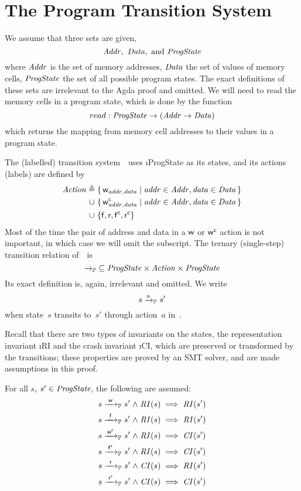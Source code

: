 \section{The Program Transition System~\Prog}
\label{sec:Prog}

We assume that three sets are given,  
$$\mathit{Addr},\ \mathit{Data},\ \text{and}\ \mathit{ProgState}$$
where $\mathit{Addr}$ is the set of memory addresses, $\mathit{Data}$ the set of values of memory cells, $\mathit{ProgState}$ the set of all possible program states.
The exact definitions of these sets are irrelevant to the Agda proof and omitted.
We will need to read the memory cells in a program state, which is done by the function
$$ read : \mathit{ProgState} \to (\mathit{Addr} \to \mathit{Data}) $$
which returns the mapping from memory cell addresses to their values in a program state.

The (labelled) transition system~\Prog\ uses \i{ProgState} as its states, and its actions (labels) are defined by%
\begin{align*}
	\mathit{Action} {}\triangleq{}{} &\{\, \mathsf w_{\mathit{addr}, \mathit{data}} \mid \mathit{addr} \in \mathit{Addr}, \mathit{data} \in \mathit{Data} \,\} \\
	\cup \ &\{\, \mathsf w^\mathsf{c}_{\mathit{addr}, \mathit{data}} \mid \mathit{addr} \in \mathit{Addr}, \mathit{data} \in \mathit{Data} \,\}\\
	\cup \ &\{ \mathsf f, \mathsf r, \mathsf{f^c}, \mathsf{r^c} \}
\end{align*}
Most of the time the pair of address and data in a $\mathsf w$ or $\mathsf w^\mathsf{c}$ action is not important, in which case we will omit the subscript.
The ternary (single-step) transition relation of~\Prog\ is
$${\xrightarrow{}_{\mathbb P}} \subseteq \mathit{ProgState} \times \mathit{Action} \times \mathit{ProgState}$$
Its exact definition is, again, irrelevant and omitted.
We write
$$s \xrightarrow{a}_{\mathbb P} s'$$
when state~$s$ transits to~$s'$ through action~$a$ in~\Prog.

Recall that there are two types of invariants on the states, the representation invariant \i{RI} and the crash invariant \i{CI}, which are preserved or transformed by the transitions; these properties are proved by an SMT solver, and are made assumptions in this proof.
\begin{assumption}
For all $s$, $s' \in \mathit{ProgState}$, the following are assumed:
\begin{align*}
s \ttP{\awa{\actw}{\actw }} s' \conj \i{RI}(s) &\implies \i{RI}(s')\\
s \ttP{\awa{\actw}{\actf }} s' \conj \i{RI}(s) &\implies \i{RI}(s')\\
s \ttP{\awa{\actw}{\actwc}} s' \conj \i{RI}(s) &\implies \i{CI}(s')\\
s \ttP{\awa{\actw}{\actfc}} s' \conj \i{RI}(s) &\implies \i{CI}(s')\\
s \ttP{\awa{\actw}{\actr }} s' \conj \i{CI}(s) &\implies \i{RI}(s')\\
s \ttP{\awa{\actw}{\actrc}} s' \conj \i{CI}(s) &\implies \i{CI}(s')
\end{align*}
\end{assumption}

